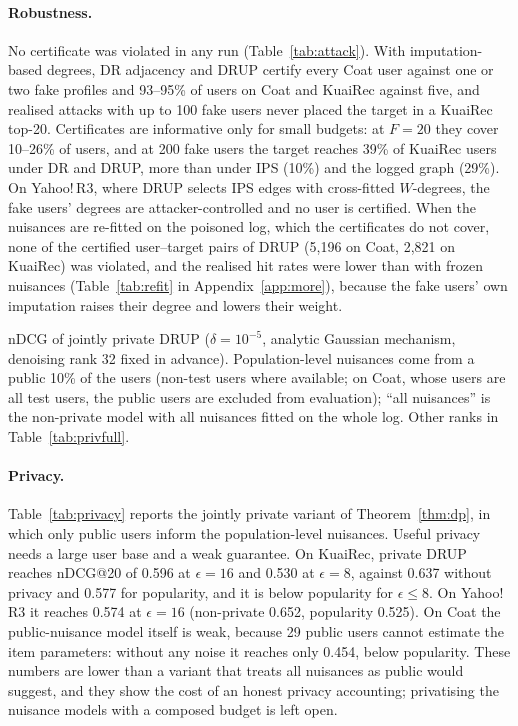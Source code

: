 \paragraph{Robustness.} No certificate was violated in any run
(Table~\ref{tab:attack}). With imputation-based degrees, DR adjacency and DRUP
certify every Coat user against one or two fake profiles and 93--95\% of users on
Coat and KuaiRec against five, and realised attacks with up to 100 fake users
never placed the target in a KuaiRec top-20. Certificates are informative only
for small budgets: at $F=20$ they cover 10--26\% of users, and at 200 fake users
the target reaches 39\% of KuaiRec users under DR and DRUP, more than under IPS
(10\%) and the logged graph (29\%). On Yahoo!\,R3, where DRUP selects IPS edges with
cross-fitted $W$-degrees, the fake users' degrees are attacker-controlled and no
user is certified. When the nuisances are re-fitted on the poisoned log, which
the certificates do not cover, none of the certified user--target pairs of DRUP (5{,}196 on Coat, 2{,}821 on KuaiRec)
was violated, and the realised hit rates were lower than with frozen nuisances
(Table~\ref{tab:refit} in Appendix~\ref{app:more}), because the fake users' own
imputation raises their degree and lowers their weight.

\begin{table}[t]\centering\small
\caption{nDCG of jointly private DRUP ($\delta=10^{-5}$, analytic Gaussian mechanism,
denoising rank 32 fixed in advance). Population-level nuisances come from a
public 10\% of the users (non-test users where available; on Coat, whose
users are all test users, the public users are excluded from evaluation); ``all nuisances'' is the non-private model
with all nuisances fitted on the whole log. Other ranks in
Table~\ref{tab:privfull}.}\label{tab:privacy}
\begin{adjustbox}{max width=\textwidth}

\end{adjustbox}
\end{table}

\paragraph{Privacy.} Table~\ref{tab:privacy} reports the jointly private variant of
Theorem~\ref{thm:dp}, in which only public users inform the population-level
nuisances. Useful privacy needs a large user base and a weak
guarantee. On KuaiRec, private DRUP reaches nDCG@20 of 0.596 at $\epsilon=16$ and 0.530 at
$\epsilon=8$, against 0.637 without privacy and 0.577 for popularity, and it is below
popularity for $\epsilon\le8$. On Yahoo!\,R3 it reaches 0.574 at $\epsilon=16$ (non-private
0.652, popularity 0.525). On Coat the public-nuisance model itself is weak, because
29 public users cannot estimate the item parameters: without any noise it
reaches only 0.454, below popularity. These numbers are lower than a variant
that treats all nuisances as public would suggest, and they show the cost of an
honest privacy accounting; privatising the nuisance models with a composed
budget is left open.
